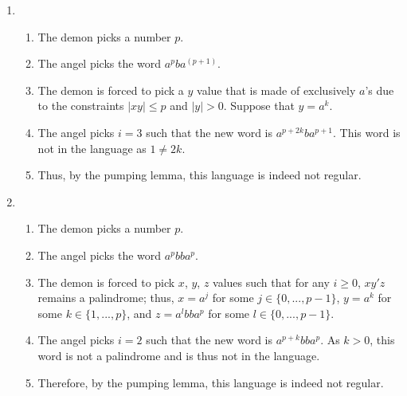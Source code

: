 \documentclass{article}
\begin{document}
\begin{enumerate}
    \item \begin{enumerate}
        \item The demon picks a number \(p\).
        \item The angel picks the word \(a^pba^{(p+1)}\).
        \item The demon is forced to pick a \(y\) value that is made of exclusively \(a\)'s due to the constraints \(|xy|\leq p\) and \(|y| > 0\). Suppose that \(y=a^k\).
        \item The angel picks \(i=3\) such that the new word is \(a^{p+2k}ba^{p+1}\). This word is not in the language as \(1 \neq 2k\).
        \item Thus, by the pumping lemma, this language is indeed not regular.
    \end{enumerate}
    \item \begin{enumerate}
        \item The demon picks a number \(p\).
        \item The angel picks the word \(a^pbba^p\).
        \item The demon is forced to pick \(x\), \(y\), \(z\) values such that for any \(i \geq 0\), \(xy'z\) remains a palindrome; thus, \(x = a^j\) for some \(j\in\{0,...,p-1\}\), \(y = a^k\) for some \(k\in \{1,...,p\}\), and \(z=a^lbba^p\) for some \(l \in \{0,...,p-1\}\).
        \item The angel picks \(i=2\) such that the new word is \(a^{p+k}bba^p\). As \(k>0\), this word is not a palindrome and is thus not in the language.
        \item Therefore, by the pumping lemma, this language is indeed not regular.
    \end{enumerate}
\end{enumerate}
\end{document}
